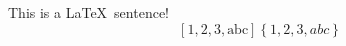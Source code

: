 \documentclass[a4paper, 12pt]{article}
\begin{document}
	\noindent This is a \LaTeX\ sentence!
	\begin{equation*}
		\left[ 1, 2, 3, \text{abc} \right]
		\left\{ 1, 2, 3, abc \right\}
	\end{equation*}
\end{document}
